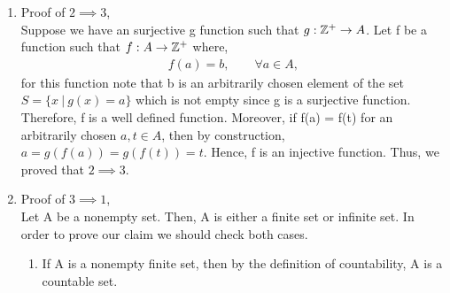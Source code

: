 \documentclass[11pt]{article}
\newcommand{\Z}{\mathbb{Z}}
\begin{document}
\begin{enumerate}
	\item 
	Proof of $2 \implies 3$,\\
	Suppose we have an surjective g function such that $g:\Z\textsuperscript{+}\rightarrow A$. Let f be a function such that $f:A\rightarrow\Z\textsuperscript{+}$ where,
	\begin{equation*}
	\begin{split}
    f(a) = b,  \qquad \forall a \in A,
	\end{split}
	\end{equation*}
	for this function note that b is an arbitrarily chosen element of the set $S = \{ x \ | \ g(x) = a\}$ which is not empty since g is a surjective function. Therefore, f is a well defined function. Moreover, if f(a) = f(t) for an arbitrarily chosen $a,t \in A$, then by construction, $a = g(f(a)) = g(f(t)) = t$. Hence, f is an injective function. Thus, we proved that $2 \implies 3$.

    \item
    Proof of $3 \implies 1$,\\
    Let A be a nonempty set. Then, A is either a finite set or infinite set. In order to prove our claim we should check both cases.
    \renewcommand{\theenumii}{\roman{enumii}}
    \begin{enumerate}
    	\item
    	If A is a nonempty finite set, then by the definition of countability, A is a countable set.
    	

\end{enumerate}
\end{enumerate}
\end{document}
